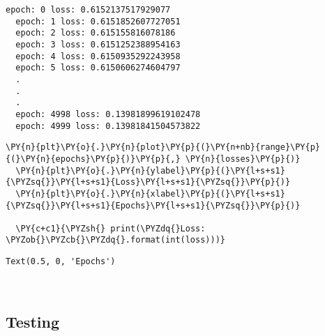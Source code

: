       \begin{Verbatim}[commandchars=\\\{\}]
  epoch: 0 loss: 0.6152137517929077
  epoch: 1 loss: 0.6151852607727051
  epoch: 2 loss: 0.615155816078186
  epoch: 3 loss: 0.6151252388954163
  epoch: 4 loss: 0.6150935292243958
  epoch: 5 loss: 0.6150606274604797
  .
  .
  .
  epoch: 4998 loss: 0.13981899619102478
  epoch: 4999 loss: 0.13981841504573822
      \end{Verbatim}

      \begin{tcolorbox}[breakable, size=fbox, boxrule=1pt, pad at break*=1mm,colback=cellbackground, colframe=cellborder]
  \begin{Verbatim}[commandchars=\\\{\}]
  \PY{n}{plt}\PY{o}{.}\PY{n}{plot}\PY{p}{(}\PY{n+nb}{range}\PY{p}{(}\PY{n}{epochs}\PY{p}{)}\PY{p}{,} \PY{n}{losses}\PY{p}{)}
  \PY{n}{plt}\PY{o}{.}\PY{n}{ylabel}\PY{p}{(}\PY{l+s+s1}{\PYZsq{}}\PY{l+s+s1}{Loss}\PY{l+s+s1}{\PYZsq{}}\PY{p}{)}
  \PY{n}{plt}\PY{o}{.}\PY{n}{xlabel}\PY{p}{(}\PY{l+s+s1}{\PYZsq{}}\PY{l+s+s1}{Epochs}\PY{l+s+s1}{\PYZsq{}}\PY{p}{)}

  \PY{c+c1}{\PYZsh{} print(\PYZdq{}Loss: \PYZob{}\PYZcb{}\PYZdq{}.format(int(loss)))}
  \end{Verbatim}
  \end{tcolorbox}

              \begin{tcolorbox}[breakable, size=fbox, boxrule=.5pt, pad at break*=1mm, opacityfill=0]
  \begin{Verbatim}[commandchars=\\\{\}]
  Text(0.5, 0, 'Epochs')
  \end{Verbatim}
  \end{tcolorbox}
          
      \begin{center}
      \end{center}
      { \hspace*{\fill} \\}
      
      \hypertarget{testing}{%
  \subsection{Testing}\label{testing}}

